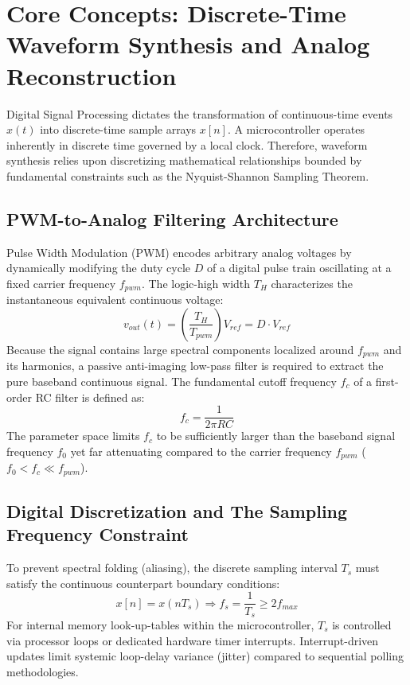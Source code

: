 \documentclass[11pt,letterpaper]{article}
\begin{document}
\clearpage

\section{Core Concepts: Discrete-Time Waveform Synthesis and Analog Reconstruction}
Digital Signal Processing dictates the transformation of continuous-time events $x(t)$ into discrete-time sample arrays $x[n]$. A microcontroller operates inherently in discrete time governed by a local clock. Therefore, waveform synthesis relies upon discretizing mathematical relationships bounded by fundamental constraints such as the Nyquist-Shannon Sampling Theorem.

\subsection{PWM-to-Analog Filtering Architecture}
Pulse Width Modulation (PWM) encodes arbitrary analog voltages by dynamically modifying the duty cycle $D$ of a digital pulse train oscillating at a fixed carrier frequency $f_{pwm}$. The logic-high width $T_H$ characterizes the instantaneous equivalent continuous voltage:
\begin{equation}
    v_{out}(t) = \left( \frac{T_H}{T_{pwm}} \right) V_{ref} = D \cdot V_{ref}
\end{equation}
Because the signal contains large spectral components localized around $f_{pwm}$ and its harmonics, a passive anti-imaging low-pass filter is required to extract the pure baseband continuous signal. The fundamental cutoff frequency $f_c$ of a first-order RC filter is defined as:
\begin{equation}
    f_c = \frac{1}{2\pi R C}
\end{equation}
The parameter space limits $f_c$ to be sufficiently larger than the baseband signal frequency $f_0$ yet far attenuating compared to the carrier frequency $f_{pwm}$ ($f_0 < f_c \ll f_{pwm}$).

\subsection{Digital Discretization and The Sampling Frequency Constraint}
To prevent spectral folding (aliasing), the discrete sampling interval $T_s$ must satisfy the continuous counterpart boundary conditions:
\begin{equation}
    x[n] = x(n T_s) \Rightarrow f_s = \frac{1}{T_s} \geq 2 f_{max}
\end{equation}
For internal memory look-up-tables within the microcontroller, $T_s$ is controlled via processor loops or dedicated hardware timer interrupts. Interrupt-driven updates limit systemic loop-delay variance (jitter) compared to sequential polling methodologies.
\end{document}
